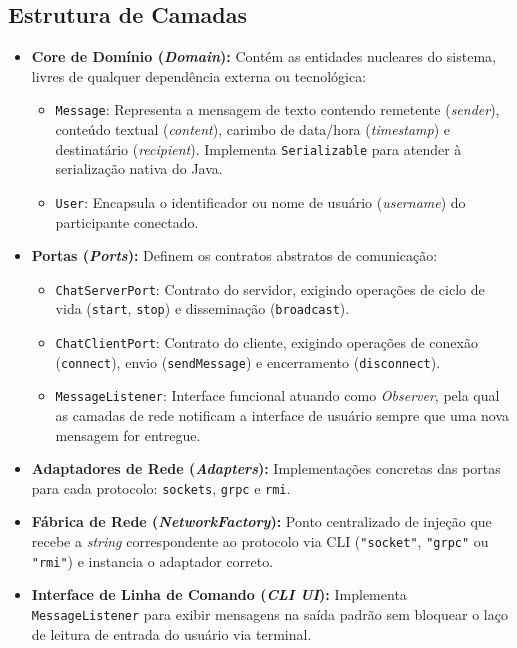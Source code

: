 \documentclass[12pt,a4paper]{article}
\begin{document}
\subsection{Estrutura de Camadas}
\begin{itemize}
    \item \textbf{Core de Domínio (\textit{Domain}):} Contém as entidades nucleares do sistema, livres de qualquer dependência externa ou tecnológica:
    \begin{itemize}
        \item \texttt{Message}: Representa a mensagem de texto contendo remetente (\textit{sender}), conteúdo textual (\textit{content}), carimbo de data/hora (\textit{timestamp}) e destinatário (\textit{recipient}). Implementa \texttt{Serializable} para atender à serialização nativa do Java.
        \item \texttt{User}: Encapsula o identificador ou nome de usuário (\textit{username}) do participante conectado.
    \end{itemize}
    \item \textbf{Portas (\textit{Ports}):} Definem os contratos abstratos de comunicação:
    \begin{itemize}
        \item \texttt{ChatServerPort}: Contrato do servidor, exigindo operações de ciclo de vida (\texttt{start}, \texttt{stop}) e disseminação (\texttt{broadcast}).
        \item \texttt{ChatClientPort}: Contrato do cliente, exigindo operações de conexão (\texttt{connect}), envio (\texttt{sendMessage}) e encerramento (\texttt{disconnect}).
        \item \texttt{MessageListener}: Interface funcional atuando como \textit{Observer}, pela qual as camadas de rede notificam a interface de usuário sempre que uma nova mensagem for entregue.
    \end{itemize}
    \item \textbf{Adaptadores de Rede (\textit{Adapters}):} Implementações concretas das portas para cada protocolo: \texttt{sockets}, \texttt{grpc} e \texttt{rmi}.
    \item \textbf{Fábrica de Rede (\textit{NetworkFactory}):} Ponto centralizado de injeção que recebe a \textit{string} correspondente ao protocolo via CLI (\texttt{"socket"}, \texttt{"grpc"} ou \texttt{"rmi"}) e instancia o adaptador correto.
    \item \textbf{Interface de Linha de Comando (\textit{CLI UI}):} Implementa \texttt{MessageListener} para exibir mensagens na saída padrão sem bloquear o laço de leitura de entrada do usuário via terminal.
\end{itemize}
\end{document}
